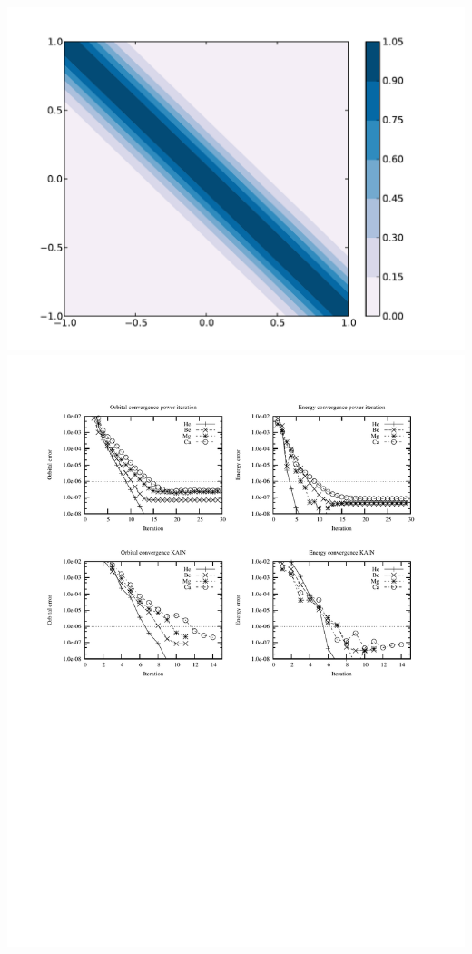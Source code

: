 \documentclass [a4paper, landscape]{report}
\begin{document}
\includegraphics[scale=0.1, clip, viewport = 100 100 370 362]{sparsematrix.pdf}
\includegraphics[scale=0.1, clip, viewport = 100 000 370 262]{../accuracy.pdf}
\end{document}
